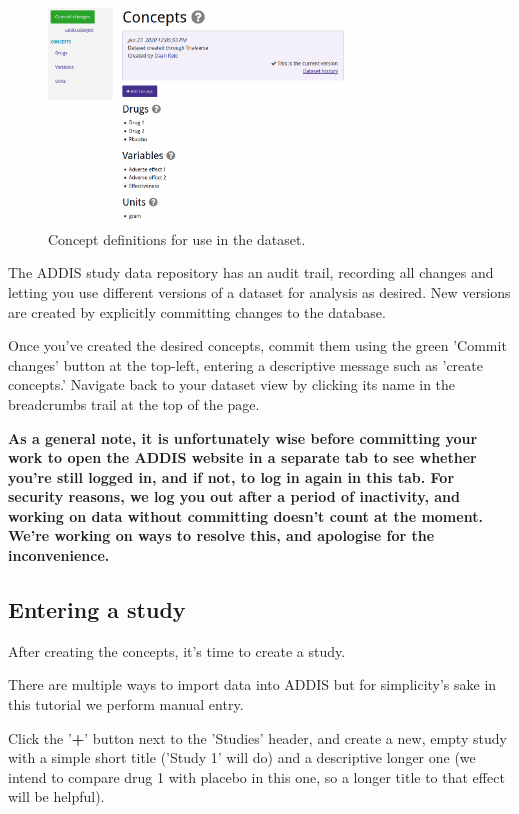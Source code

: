 \documentclass[12pt]{article}
\begin{document}
\begin{figure}[!ht]
  \centering
  \includegraphics[width=0.7\textwidth]{img/concepts.png}
  \caption{Concept definitions for use in the dataset.}
\label{fig:concepts}
\end{figure}

The ADDIS study data repository has an audit trail, recording all changes and letting you use different versions of a dataset for analysis as desired.
New versions are created by explicitly committing changes to the database.

Once you've created the desired concepts, commit them using the green 'Commit changes' button at the top-left, entering a descriptive message such as 'create concepts.'
Navigate back to your dataset view by clicking its name in the breadcrumbs trail at the top of the page.

\textbf{As a general note, it is unfortunately wise before committing your work to open the ADDIS website in a separate tab to see whether you're still logged in, and if not, to log in again in this tab.
For security reasons, we log you out after a period of inactivity, and working on data without committing doesn't count at the moment.
We're working on ways to resolve this, and apologise for the inconvenience.}

\subsection{Entering a study}

After creating the concepts, it's time to create a study.

There are multiple ways to import data into ADDIS but for simplicity's sake in this tutorial we perform manual entry.

Click the '\textbf{+}' button next to the 'Studies' header, and create a new, empty study with a simple short title ('Study 1' will do) and a descriptive longer one (we intend to compare drug 1 with placebo in this one, so a longer title to that effect will be helpful).
\end{document}
